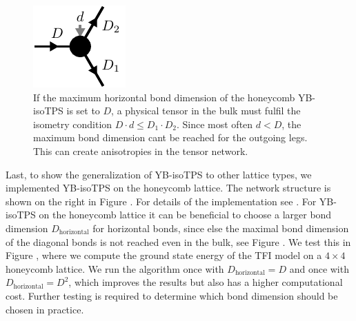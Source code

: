 \begin{figure}
	\centering
	\includegraphics[scale=1]{figures/tikz/TFI/hexagonal_lattice/hexagonal_lattice_horizontal_bond_problem.pdf}
	\caption{If the maximum horizontal bond dimension of the honeycomb YB-isoTPS is set to $D$, a physical tensor in the bulk must fulfil the isometry condition $D\cdot d \le D_1\cdot D_2$. Since most often $d < D$, the maximum bond dimension cant be reached for the outgoing legs. This can create anisotropies in the tensor network.}
	\label{fig:honeycomb_horizontal_bond_problem}
\end{figure}
%
Last, to show the generalization of YB-isoTPS to other lattice types, we implemented YB-isoTPS on the honeycomb lattice. The network structure is shown on the right in Figure . For details of the implementation see \cite{cite:github_YB_isoTPS}. For YB-isoTPS on the honeycomb lattice it can be beneficial to choose a larger bond dimension $D_\text{horizontal}$ for horizontal bonds, since else the maximal bond dimension of the diagonal bonds is not reached even in the bulk, see Figure . We test this in Figure , where we compute the ground state energy of the TFI model on a $4\times4$ honeycomb lattice. We run the algorithm once with $D_\text{horizontal} = D$ and once with $D_\text{horizontal} = D^2$, which improves the results but also has a higher computational cost. Further testing is required to determine which bond dimension should be chosen in practice.